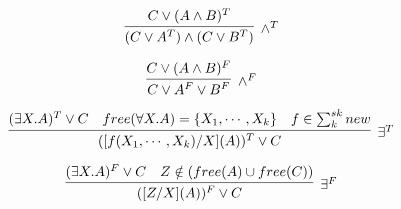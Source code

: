 \begin{multicols}{2}
    \noindent
    \begin{minipage}{\linewidth}
        \[
            \infer[\land^T]
            {(C \lor A^T) \land (C \lor B^T)}
            {C \lor (A \land B)^T}
        \]
    \end{minipage}
    \noindent
    \begin{minipage}{\linewidth}
        \[
            \infer[\land^F]
            {C \lor A^F \lor B^F}
            {C \lor (A \land B)^F}
        \]
    \end{minipage}
\end{multicols}

\noindent
\begin{minipage}{\linewidth}
    \[
        \infer[\exists^T]
        {([f(X_1,\cdots,X_k)/X](A))^T \lor C}
        {(\exists X.A)^T \lor C \quad free(\forall X.A) = \{X_1,\cdots,X_k\} \quad
        f \in \sum_{k}^{sk} new}        
    \]
\end{minipage}

\noindent
\begin{minipage}{\linewidth}
    \[
        \infer[\exists^F]
        {([Z/X](A))^F \lor C}
        {(\exists X.A)^F \lor C \quad Z \notin (free(A) \cup free(C))}        
    \]
\end{minipage}